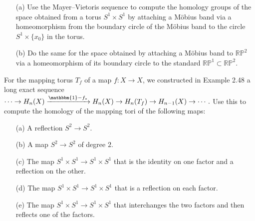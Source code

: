 \documentclass[12pt]{article}
\begin{document}
\begin{statement}[2.2.28]
    \begin{itemize}
        \item[(a)] Use the Mayer–Vietoris sequence to compute the homology groups of the space obtained from a torus $S^1 \times S^1$ by attaching a Möbius band via a homeomorphism from the boundary circle of the Möbius band to the circle $S^1 \times \{x_0\}$ in the torus.

        \item[(b)] Do the same for the space obtained by attaching a Möbius band to $\mathbb{RP}^2$ via a homeomorphism of its boundary circle to the standard $\mathbb{RP}^1 \subset \mathbb{RP}^2$.
    \end{itemize}
\end{statement}

\begin{statement}[2.2.30]
    For the mapping torus $T_f$ of a map $f : X \to X$, we constructed in Example 2.48 a long exact sequence $ \cdots \to H_n(X) \xrightarrow{\mathbbm{1} - f_*} H_n(X) \to H_n(T_f) \to H_{n-1}(X) \to \cdots .$ Use this to compute the homology of the mapping tori of the following maps:
    \begin{itemize}
        \item[(a)] A reflection $S^2 \to S^2$.
        \item[(b)] A map $S^2 \to S^2$ of degree $2$.
        \item[(c)] The map $S^1 \times S^1 \to S^1 \times S^1$ that is the identity on one factor and a reflection on the other.
        \item[(d)] The map $S^1 \times S^1 \to S^1 \times S^1$ that is a reflection on each factor.
        \item[(e)] The map $S^1 \times S^1 \to S^1 \times S^1$ that interchanges the two factors and then reflects one of the factors.
    \end{itemize}
\end{statement}
\end{document}
